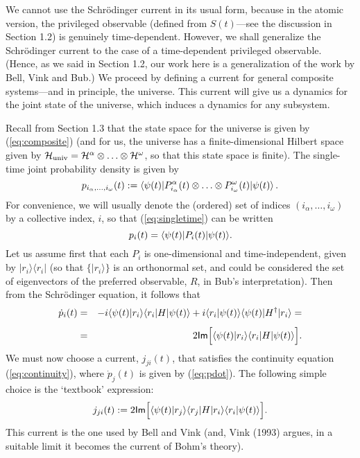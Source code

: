 \documentclass[12pt]{article}
\newcommand{\be}{\vspace*{6pt} \begin{equation}}
\newcommand{\ee}{\vspace*{10pt} \end{equation}}
\newcommand{\cH}{\cal{H}}                                       %
\newcommand{\ga}{\alpha}                                        %
\newcommand{\gw}{\omega}                                        %
\renewcommand{\Im}{\mbox{{\sf Im}}}                             %
\newcommand{\bra}[1]{\langle #1\vert}                           %
\newcommand{\ket}[1]{\vert #1\rangle}                           %
\newcommand{\braket}[2]{\langle #1\vert #2\rangle}              %
\begin{document}
We cannot use the Schr\"odinger current in its usual form, because in 
the atomic version, the privileged observable (defined from 
$S(t)$---see the discussion in Section 1.2) is genuinely 
time-dependent.  However, we shall generalize the Schr\"odinger 
current to the case of a time-dependent privileged observable.  
(Hence, as we said in Section 1.2, our work here is a generalization 
of the work by Bell, Vink and Bub.) We proceed by defining a current 
for general composite systems---and in principle, the universe.  This 
current will give us a dynamics for the joint state of the universe, 
which induces a dynamics for any subsystem.

Recall from Section 1.3 that the state space for the universe is given 
by (\ref{eq:composite}) (and for us, the universe has a 
finite-dimensional Hilbert space given by $\cH_{\mbox{\scriptsize 
univ}} = \cH^\ga \otimes \ldots \otimes \cH^\gw$, so that this state 
space is finite).  The single-time joint probability density is given 
by
\be
  \label{eq:singletime}
  p_{i_\ga, \ldots , i_\gw}(t) :=
  \bra{\psi(t)}
  P^\ga_{i_\ga}(t) \otimes \ldots \otimes P^\gw_{i_\gw}(t)
  \ket{\psi(t)}\,.
\ee
For convenience, we will usually denote the (ordered) set of indices
$(i_\ga, \ldots , i_\gw)$ by a collective index, $i$, so
that (\ref{eq:singletime}) can be written
\be
  \label{eq:easysingletime}
  p_i(t) =
  \bra{\psi(t)} P_i(t) \ket{\psi(t)}.
\ee
Let us assume first that each $P_i$ is one-dimensional and 
time-independent, given by $\ket{r_i}\bra{r_i}$ (so that 
$\{\ket{r_i}\}$ is an orthonormal set, and could be considered the set 
of eigenvectors of the preferred observable, $R$, in Bub's 
interpretation).  Then from the Schr\"odinger equation, it follows 
that
\begin{eqnarray}
  \dot{p}_i(t) & = & -i\braket{\psi(t)}{r_i}\bra{r_i} H \ket{\psi(t)} + 
  i\braket{r_i}{\psi(t)}\bra{\psi(t)} H^{\dagger} \ket{r_i}= \nonumber 
  \\[1ex] 
  \ & = & 2 \Im \Big[ \braket{\psi(t)}{r_i}\bra{r_i}H 
  \ket{\psi(t)} \Big].  \label{eq:pdot}
\end{eqnarray}
We must now choose a current, $j_{ji}(t)$, that satisfies the
continuity equation (\ref{eq:continuity}), where $\dot{p}_j(t)$ is
given by (\ref{eq:pdot}).  The following simple choice is the
`textbook' expression:
\be
  \label{eq:current1}
  j_{ji}(t) := 2 \Im \Big[
  \braket{\psi(t)}{r_j}\bra{r_j}H\ket{r_i}\braket{r_i}{\psi(t)} \Big].
\ee
This current is the one used by Bell and Vink (and, Vink (1993)
argues, in a suitable limit it becomes the current of Bohm's theory).
\end{document}
